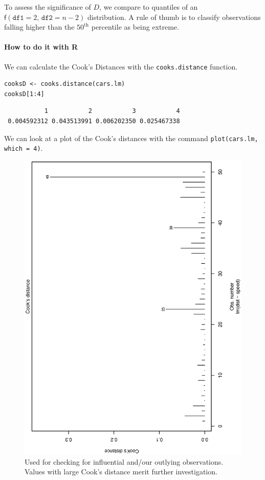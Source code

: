 \documentclass[captions=tableheading]{scrbook}
\begin{document}
To assess the significance of \(D\), we compare to quantiles of an \(\mathsf{f}(\mathtt{df1}=2,\,\mathtt{df2}=n-2)\) distribution. A rule of thumb is to classify observations falling higher than the \(50^{\mathrm{th}}\) percentile as being extreme. 

\paragraph*{How to do it with \textsf{R}}

We can calculate the Cook's Distances with the \texttt{cooks.distance} function.


\begin{verbatim}
cooksD <- cooks.distance(cars.lm)
cooksD[1:4]
\end{verbatim}

\begin{verbatim}
           1           2           3           4 
 0.004592312 0.043513991 0.006202350 0.025467338
\end{verbatim}

We can look at a plot of the Cook's distances with the command \texttt{plot(cars.lm, which = 4)}.

\begin{figure}[th]
  \includegraphics[angle=270, totalheight=4in]{ps/Cooks-distance-cars.ps}
  \caption[Cook's distances for the \texttt{cars} data]{\small Used for checking for influential and/our outlying observations. Values with large Cook's distance merit further investigation.}
  \label{fig:Cooks-distance-cars}
\end{figure}
\end{document}
